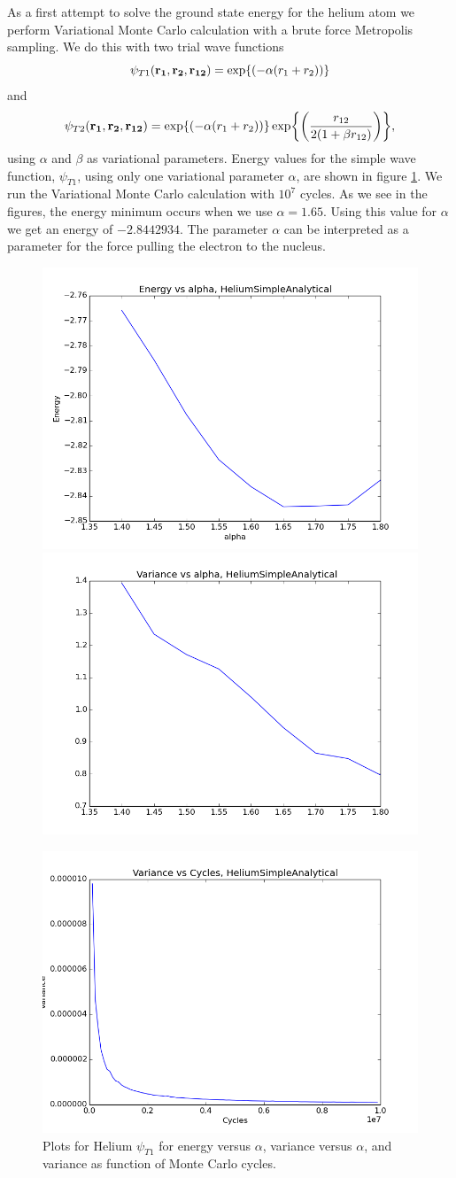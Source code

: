 \documentclass[11pt]{article}
\begin{document}
As a first attempt to solve the ground state energy for the helium
atom we perform Variational Monte Carlo calculation with a brute force
Metropolis sampling. We do this with two trial wave functions
\[
\psi_{T1}({\bf r_{1}},{\bf r_{2}},{\bf r_{12}})=\exp{\left(-\alpha(r_{1}+r_{2})\right)}
\]
and 
\[
\psi_{T2}({\bf r_{1}},{\bf r_{2}},{\bf r_{12}})=\exp{\left(-\alpha(r_{1}+r_{2})\right)}\exp{\left(\frac{r_{12}}{2(1+\beta r_{12})}\right)},
\]
using $\alpha$ and $\beta$ as variational parameters. Energy values
for the simple wave function, $\psi_{T1}$, using only one variational
parameter $\alpha$, are shown in figure \ref{fig01:alpha_Simple}.
We run the Variational Monte Carlo calculation with $10^{7}$ cycles.
As we see in the figures, the energy minimum occurs when we use $\alpha=1.65$.
Using this value for $\alpha$ we get an energy of $-2.8442934$. 
The parameter $\alpha$ can be interpreted as a parameter for the
force pulling the electron to the nucleus. 

\begin{figure}
\centering \includegraphics[width=0.45\linewidth]{figures/EnergyVsAlphaHeliumSimpleAnalytical}
\includegraphics[width=0.45\linewidth]{figures/VarianceVsAlphaHeliumSimpleAnalytical}

\includegraphics[width=0.45\linewidth]{figures/VarianceNCyclesHeliumSimpleAnalytical}\protect\protect\caption{Plots for Helium $\psi_{T1}$ for energy versus $\alpha$, variance versus $\alpha$, and variance as function of Monte Carlo cycles.}
\label{fig01:alpha_Simple} 
\end{figure}
\end{document}
